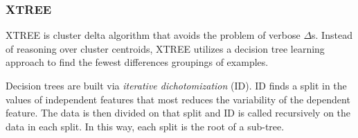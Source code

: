 \documentclass{sig-alternate}
\begin{document}
\subsubsection{XTREE}

  XTREE  is cluster delta algorithm
  that avoids the problem of verbose $\Delta$s.
  Instead of reasoning over cluster centroids,
  XTREE utilizes a decision tree learning approach
  to find the fewest differences groupings of examples.
  
  Decision trees are built via
  {\em iterative dichotomization} (ID).
  ID   finds  a  split  in  the  values  of  independent  features  that  most  reduces the variability of the dependent feature. The data is then divided on that split
  and ID is called
  recursively on the data in each split. In this way,
  each split is the root of a sub-tree.
  
\end{document}
